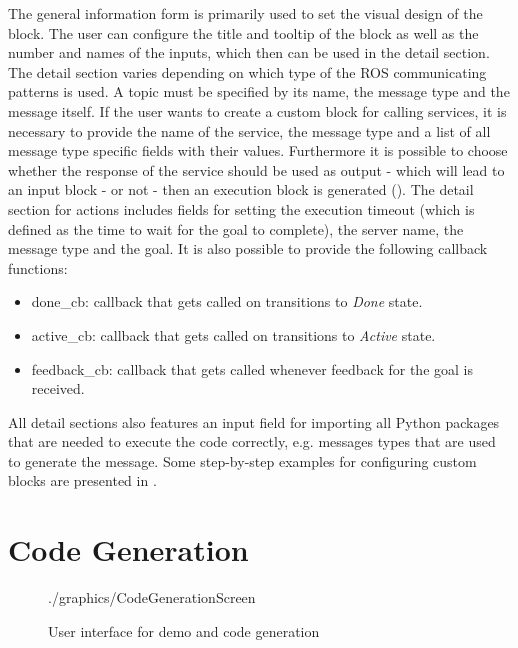 The general information form is primarily used to set the visual design of the block. The user can configure the title and tooltip of the block as well as the number and names of the inputs, which then can be used in the detail section. The detail section varies depending on which type of the ROS communicating patterns is used. A topic must be specified by its name, the message type and the message itself. If the user wants to create a custom block for calling services, it is necessary to provide the name of the service, the message type and a list of all message type specific fields with their values. Furthermore it is possible to choose whether the response of the service should be used as output - which will lead to an input block - or not - then an execution block is generated (). The detail section for actions includes fields for setting the execution timeout (which is defined as the time to wait for the goal to complete), the server name, the message type and the goal. It is also possible to provide the following callback functions:

\begin{itemize}
	\item done\_cb: callback that gets called on transitions to  \textit{Done} state.
	\item active\_cb: callback that gets called on transitions to  \textit{Active} state.
	\item feedback\_cb: callback that gets called whenever feedback for the goal is received.
\end{itemize}

All detail sections also features an input field for importing all Python packages that are needed to execute the code correctly, e.g. messages types that are used to generate the message. Some step-by-step examples for configuring custom blocks are presented in .

\section{Code Generation}

\begin{figure}[htbp]
	\centering
	\begin{overpic}[width=\linewidth]{./graphics/CodeGenerationScreen}
	\end{overpic}
	\caption{User interface for demo and code generation}%
	\label{fig:CodeGeneration}%
\end{figure}

